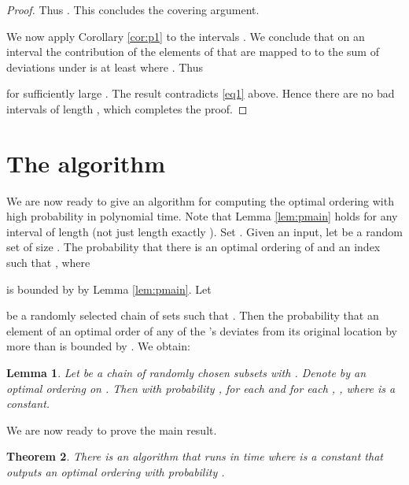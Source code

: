 \documentclass[11pt]{article}
\newtheorem{theorem}{Theorem}
\newtheorem{lemma}[theorem]{Lemma}
\begin{document}
\begin{proof}
Thus . This concludes the covering argument.

We now apply Corollary \ref{cor:p1} to the intervals . We conclude that on an interval
 the contribution of the elements of  that are mapped to  to the sum of 
deviations under  is at least  where .
Thus 

for sufficiently large .
The result contradicts \eqref{eq1} above.
Hence there are no bad intervals of length , which completes the proof. 
\end{proof}



\section{The algorithm} \label{sec:alg}

We are now ready to give an algorithm for computing the optimal ordering with high
probability in polynomial time. Note that Lemma \ref{lem:pmain} holds for any interval
of length  (not just length exactly ). Set . 
Given an input, let  
 be a random set of size . The probability that there is an 
optimal ordering  of  and an index  such that , where

is bounded by  by  Lemma \ref{lem:pmain}. Let 

be a randomly selected chain of sets such that . Then the probability that 
an element of an optimal order of any of the  's deviates from its original 
location by more than     is bounded by 
. We obtain: 

\begin{lemma}
\label{lem:chain}
Let  be a chain of randomly chosen subsets with . 
Denote by  an optimal ordering on . 
Then with probability ,
for each   and for each , , where 
 is a constant.
\end{lemma}

We are now ready to prove the main result.

\begin{theorem}
\label{thm:main}
There is an algorithm that runs in time  where 
 is a constant
that outputs an optimal ordering with probability .
\end{theorem}
\end{document}
